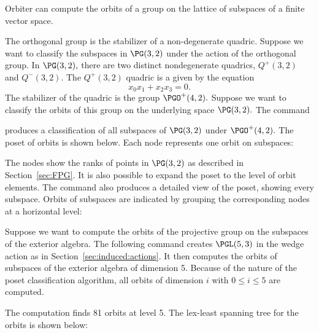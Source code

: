 Orbiter can compute the orbits of a group on 
the lattice of subspaces of a finite vector space.

\bigskip



The orthogonal group is the stabilizer of a non-degenerate quadric.  
Suppose we want to classify the subspaces in $\PG(3,2)$ under 
the action of the orthogonal group. 
In $\PG(3,2),$ there are two distinct nondegenerate quadrics, 
$Q^+(3,2)$ and $Q^-(3,2).$ 
The $Q^+(3,2)$ quadric is a given by the equation 
$$
x_0x_1 + x_2x_3 = 0.
$$
The stabilizer of the quadric is the group $\PGO^+(4,2).$
Suppose we want to classify the orbits of this group on the underlying space $\PG(3,2).$ 
The command


produces a classification of all 
subspaces of $\PG(3,2)$ under $\PGO^+(4,2).$ The poset of orbits is shown below.
Each node represents one orbit on subspaces:


The nodes show the ranks of points in $\PG(3,2)$ 
as described in Section~\ref{sec:FPG}.
It is also possible to expand the poset to the level of orbit elements. 
The command also produces a detailed view of the poset, showing every subspace. 
Orbits of subspaces are indicated by grouping the corresponding nodes 
at a horizontal level:


\bigskip


Suppose we want to compute the orbits of the projective group 
on the subspaces of the exterior algebra. 
The following command creates $\PGL(5,3)$ 
in the wedge action as in Section~\ref{sec:induced:actions}. 
It then computes the orbits of 
subspaces of the exterior algebra of dimension 5. 
Because of the nature of the poset classification algorithm, 
all orbits of dimension $i$ with $0 \le i \le 5$ are computed. 


The computation finds 81 orbits at level 5. 
The lex-least spanning tree for the orbits is shown below:



\bigskip

